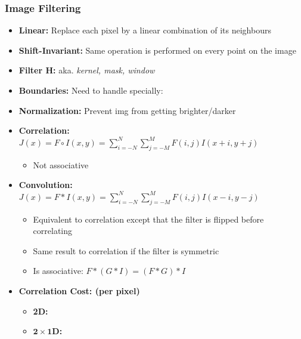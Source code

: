 \documentclass[a4paper]{article}
\newcommand{\ides}[1]{\item \textbf{#1}}
\begin{document}
\subsubsection{Image Filtering}
\begin{itemize}
    \ides{Linear:} Replace each pixel by a linear combination of its neighbours
    \ides{Shift-Invariant:} Same operation is performed on every point on the image
    \ides{Filter $\mathbf{H}$:} aka. \textit{kernel, mask, window}
    \ides{Boundaries:} Need to handle specially:
    \ides{Normalization:} Prevent img from getting brighter/darker
    \ides{Correlation:} $J(x) = F \circ I(x,y) = \sum_{i=-N}^N \sum_{j=-M}^M F(i,j) I(x + i, y + j)$
        \begin{itemize}
            \item Not associative
        \end{itemize}
    \ides{Convolution:} $J(x) = F \ast I(x,y) = \sum_{i=-N}^N \sum_{j=-M}^M F(i,j) I(x - i, y - j)$
        \begin{itemize}
            \item Equivalent to correlation except that the filter is flipped before correlating
            \item Same result to correlation if the filter is symmetric
            \item Is associative: $F \ast (G \ast I) = (F \ast G) \ast I$
        \end{itemize}
    \ides{Correlation Cost: (per pixel)}
        \begin{itemize}
            \ides{2D:}
            \ides{$\mathbf{2 \times 1D}$:}

\end{itemize}
\end{itemize}
\end{document}
